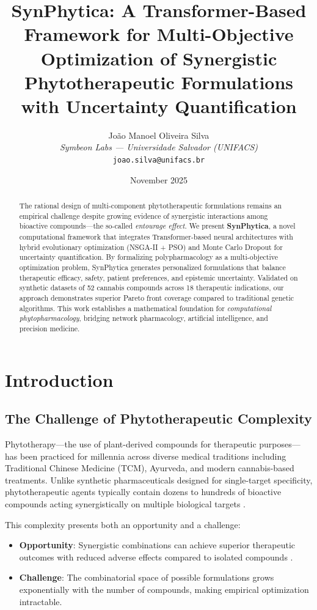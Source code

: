 \documentclass[12pt, a4paper]{article}
\title{\textbf{SynPhytica: A Transformer-Based Framework for Multi-Objective Optimization of Synergistic Phytotherapeutic Formulations with Uncertainty Quantification}}
\author{
    João Manoel Oliveira Silva \\
    \textit{Symbeon Labs — Universidade Salvador (UNIFACS)} \\
    \texttt{joao.silva@unifacs.br}
}
\date{November 2025}
\begin{document}
\maketitle

\begin{abstract}
The rational design of multi-component phytotherapeutic formulations remains an empirical challenge despite growing evidence of synergistic interactions among bioactive compounds—the so-called \textit{entourage effect}. We present \textbf{SynPhytica}, a novel computational framework that integrates Transformer-based neural architectures with hybrid evolutionary optimization (NSGA-II + PSO) and Monte Carlo Dropout for uncertainty quantification. By formalizing polypharmacology as a multi-objective optimization problem, SynPhytica generates personalized formulations that balance therapeutic efficacy, safety, patient preferences, and epistemic uncertainty. Validated on synthetic datasets of 52 cannabis compounds across 18 therapeutic indications, our approach demonstrates superior Pareto front coverage compared to traditional genetic algorithms. This work establishes a mathematical foundation for \textit{computational phytopharmacology}, bridging network pharmacology, artificial intelligence, and precision medicine.
\end{abstract}

\tableofcontents
\newpage

\section{Introduction}

\subsection{The Challenge of Phytotherapeutic Complexity}

Phytotherapy—the use of plant-derived compounds for therapeutic purposes—has been practiced for millennia across diverse medical traditions including Traditional Chinese Medicine (TCM), Ayurveda, and modern cannabis-based treatments. Unlike synthetic pharmaceuticals designed for single-target specificity, phytotherapeutic agents typically contain dozens to hundreds of bioactive compounds acting synergistically on multiple biological targets \citep{Hopkins2008, Russo2011}.

This complexity presents both an opportunity and a challenge:

\begin{itemize}
    \item \textbf{Opportunity}: Synergistic combinations can achieve superior therapeutic outcomes with reduced adverse effects compared to isolated compounds \citep{BenShabat1998, Russo2011}.
    \item \textbf{Challenge}: The combinatorial space of possible formulations grows exponentially with the number of compounds, making empirical optimization intractable.
\end{itemize}
\end{document}

